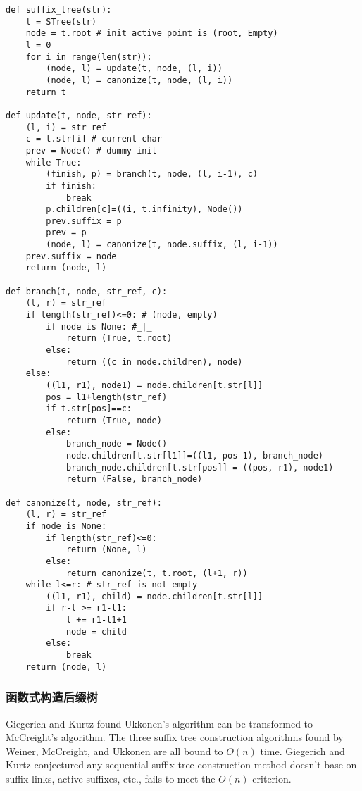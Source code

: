 \documentclass[UTF8]{article}
\begin{document}
\begin{lstlisting}
def suffix_tree(str):
    t = STree(str)
    node = t.root # init active point is (root, Empty)
    l = 0
    for i in range(len(str)):
        (node, l) = update(t, node, (l, i))
        (node, l) = canonize(t, node, (l, i))
    return t

def update(t, node, str_ref):
    (l, i) = str_ref
    c = t.str[i] # current char
    prev = Node() # dummy init
    while True:
        (finish, p) = branch(t, node, (l, i-1), c)
        if finish:
            break
        p.children[c]=((i, t.infinity), Node())
        prev.suffix = p
        prev = p
        (node, l) = canonize(t, node.suffix, (l, i-1))
    prev.suffix = node
    return (node, l)

def branch(t, node, str_ref, c):
    (l, r) = str_ref
    if length(str_ref)<=0: # (node, empty)
        if node is None: #_|_
            return (True, t.root)
        else:
            return ((c in node.children), node)
    else:
        ((l1, r1), node1) = node.children[t.str[l]]
        pos = l1+length(str_ref)
        if t.str[pos]==c:
            return (True, node)
        else:
            branch_node = Node()
            node.children[t.str[l1]]=((l1, pos-1), branch_node)
            branch_node.children[t.str[pos]] = ((pos, r1), node1)
            return (False, branch_node)

def canonize(t, node, str_ref):
    (l, r) = str_ref
    if node is None:
        if length(str_ref)<=0:
            return (None, l)
        else:
            return canonize(t, t.root, (l+1, r))
    while l<=r: # str_ref is not empty
        ((l1, r1), child) = node.children[t.str[l]]
        if r-l >= r1-l1:
            l += r1-l1+1
            node = child
        else:
            break
    return (node, l)
\end{lstlisting}

\subsubsection{函数式构造后缀树}

Giegerich and Kurtz found Ukkonen's algorithm
can be transformed to McCreight's algorithm\cite{GieKur97}.
The three suffix tree construction algorithms found by
Weiner, McCreight, and Ukkonen are all bound to $O(n)$ time.
Giegerich and Kurtz conjectured any sequential
suffix tree construction method doesn't base on
suffix links, active suffixes, etc., fails to meet the
$O(n)$-criterion.
\end{document}
